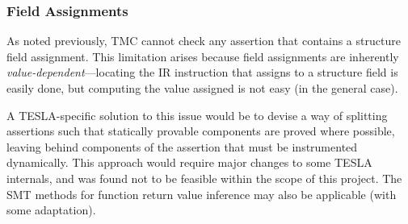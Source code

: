 \subsubsection{Field Assignments}

As noted previously, TMC cannot check any assertion that contains a structure
field assignment. This limitation arises because field assignments are
inherently \emph{value-dependent}---locating the IR instruction that assigns to
a structure field is easily done, but computing the value assigned is not easy
(in the general case).

A TESLA-specific solution to this issue would be to devise a way of
splitting assertions such that statically provable components are proved
where possible, leaving behind components of the assertion that must be
instrumented dynamically. This approach would require major changes to
some TESLA internals, and was found not to be feasible within the scope
of this project. The SMT methods for function return value inference may also be
applicable (with some adaptation).

